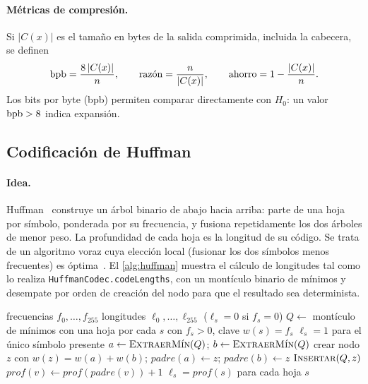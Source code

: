 \paragraph{Métricas de compresión.} Si $|C(x)|$ es el tamaño en bytes de la salida comprimida,
incluida la cabecera, se definen
\begin{equation}
  \mathrm{bpb} = \frac{8\,|C(x)|}{n}, \qquad
  \text{razón} = \frac{n}{|C(x)|}, \qquad
  \text{ahorro} = 1 - \frac{|C(x)|}{n}.
  \label{eq:metricas}
\end{equation}
Los bits por byte (bpb) permiten comparar directamente con $H_0$: un valor $\mathrm{bpb} > 8$
indica expansión.

\subsection{Codificación de Huffman}
\label{sec:huffman}
\paragraph{Idea.} Huffman~\cite{huffman1952} construye un árbol binario de abajo hacia arriba:
parte de una hoja por símbolo, ponderada por su frecuencia, y fusiona repetidamente los dos
árboles de menor peso. La profundidad de cada hoja es la longitud de su código. Se trata de un
algoritmo voraz cuya elección local (fusionar los dos símbolos menos frecuentes) es
óptima~\cite{cormen2022}. El \cref{alg:huffman} muestra el cálculo de longitudes tal como lo
realiza \texttt{HuffmanCodec.codeLengths}, con un montículo binario de mínimos y desempate
por orden de creación del nodo para que el resultado sea determinista.

\begin{algorithm}[H]
  \caption{Longitudes de código de Huffman (\texttt{codeLengths}).}
  \label{alg:huffman}
  \small
  \begin{algorithmic}[1]
    \Require frecuencias $f_0,\dots,f_{255}$
    \Ensure longitudes $\ell_0,\dots,\ell_{255}$ ($\ell_s = 0$ si $f_s = 0$)
    \State $Q \gets$ montículo de mínimos con una hoja por cada $s$ con $f_s > 0$, clave $w(s)=f_s$
     \State \Return $\ell_s = 1$ para el único símbolo presente \EndIf
      \State $a \gets \textsc{ExtraerMín}(Q)$;\; $b \gets \textsc{ExtraerMín}(Q)$
      \State crear nodo $z$ con $w(z) = w(a) + w(b)$;\; $\mathit{padre}(a) \gets z$;\; $\mathit{padre}(b) \gets z$
      \State $\textsc{Insertar}(Q, z)$
    \EndWhile
      \State $\mathit{prof}(v) \gets \mathit{prof}(\mathit{padre}(v)) + 1$ 
    \EndFor
    \State \Return $\ell_s = \mathit{prof}(s)$ para cada hoja $s$
  \end{algorithmic}
\end{algorithm}

